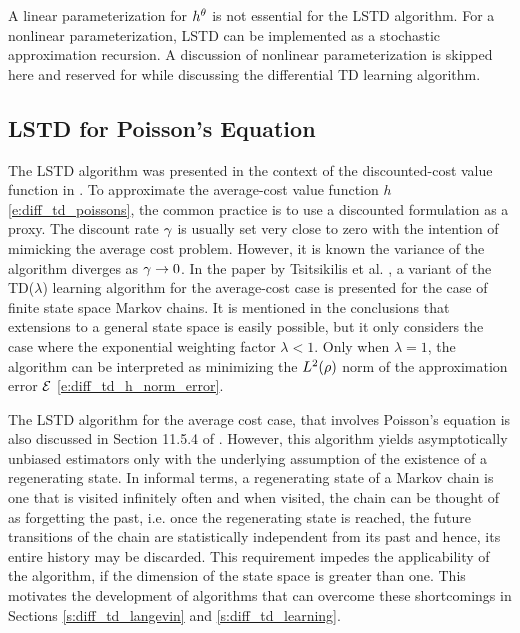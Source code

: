 A linear parameterization for $h^\theta$ is not essential for the LSTD algorithm. For a nonlinear parameterization,  LSTD can be implemented as a stochastic approximation recursion. A discussion of nonlinear parameterization is skipped here and reserved for  while discussing the differential TD learning algorithm. 

\subsection{LSTD for Poisson's Equation}
\label{s:lstd_avg_cost}
The LSTD algorithm was presented in the context of the discounted-cost value function in . To approximate the average-cost value function $h$ \eqref{e:diff_td_poissons}, the common practice is to use a discounted formulation as a proxy. The discount rate $\gamma$ is usually set very close to zero with the intention of mimicking the average cost problem. However, it is known the variance of the algorithm diverges as $\gamma \to 0$.  In the paper by Tsitsikilis et al. \cite{tsivan99b}, a variant of the TD($\lambda$) learning algorithm for the average-cost case is presented for the case of finite state space Markov chains. It is mentioned in the conclusions that extensions to a general state space is easily possible, but it only considers the case where the exponential weighting factor $\lambda <1$. Only when $\lambda =1$, the algorithm can be interpreted as minimizing the $L^2(\rho)$ norm of the approximation error $\mathcal{E}$ \eqref{e:diff_td_h_norm_error}. 

The LSTD algorithm for the average cost case, that involves Poisson's equation is also discussed in Section 11.5.4 of \cite{ctcn}. However, this algorithm yields asymptotically unbiased estimators only with the underlying assumption of the existence of a regenerating state. In informal terms, a regenerating state of a Markov chain is one that is visited infinitely often and when visited, the chain can be thought of as forgetting the past, i.e. once the regenerating state is reached, the future transitions of the chain are statistically independent from its past and hence, its entire history may be discarded. This requirement impedes the applicability of the algorithm, if the dimension of the state space is greater than one. This motivates the development of algorithms that can overcome these shortcomings in Sections \ref{s:diff_td_langevin} and \ref{s:diff_td_learning}.  


